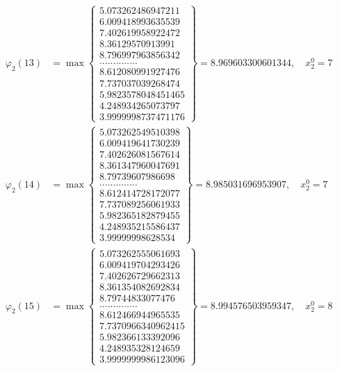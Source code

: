 \documentclass{article}
\begin{document}
\begin{align*}
  
  
  
\varphi_{2}(13) &= \max \left\{ \begin{array}{c}
5.073262486947211 \\
 6.009418993635539 \\
 7.402619958922472 \\
 8.36129570913991 \\
 8.796997963856342 \\
 .............. \\
 8.612080991927476 \\
 7.737037039268474 \\
 5.9823578048451465 \\
 4.248934265073797 \\
 3.9999998737471176
\end{array} \right\} = 8.969603300601344, \quad x_{2}^0 = 7\\
  
  
  
  
\varphi_{2}(14) &= \max \left\{ \begin{array}{c}
5.073262549510398 \\
 6.009419641730239 \\
 7.402626081567614 \\
 8.361347960047691 \\
 8.79739607986698 \\
 .............. \\
 8.612414728172077 \\
 7.737089256061933 \\
 5.982365182879455 \\
 4.248935215586437 \\
 3.99999998628534
\end{array} \right\} = 8.985031696953907, \quad x_{2}^0 = 7\\
  
  
  
  
\varphi_{2}(15) &= \max \left\{ \begin{array}{c}
5.073262555061693 \\
 6.009419704293426 \\
 7.402626729662313 \\
 8.361354082692834 \\
 8.79744833077476 \\
 .............. \\
 8.612466944965535 \\
 7.7370966340962415 \\
 5.982366133392096 \\
 4.248935328124659 \\
 3.9999999986123096
\end{array} \right\} = 8.994576503959347, \quad x_{2}^0 = 8\\
  

\end{align*}
\end{document}
